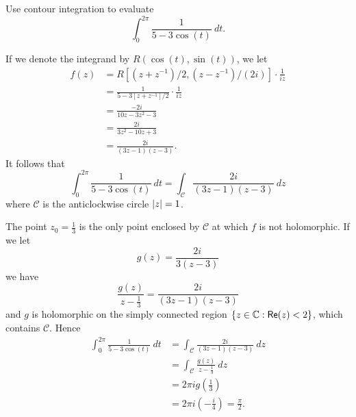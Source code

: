 \begin{example}
Use contour integration to evaluate
\[
\int_0^{2\pi} \frac{1}{5-3\cos (t)}\ dt.
\]

If we denote the integrand by $R(\cos(t),\sin(t))$, we let
\begin{align*}
f(z) &= R \left[ (z+z^{-1})/2 , (z-z^{-1})/(2i) \right] \cdot \frac{1}{iz}\\
& = \frac{1}{5-3[z+z^{-1}]/2} \cdot \frac{1}{iz} \\
& = \frac{-2i}{10z-3z^2-3} \\
& = \frac{2i}{3z^2-10z+3} \\
& = \frac{2i}{(3z-1)(z-3)}.
\end{align*}
It follows that
\[
\int_0^{2\pi} \frac{1}{5-3\cos (t)}\ dt = \int_{\mathcal{C}} \frac{2i}{(3z-1)(z-3)}\ dz
\]
where $\mathcal{C}$ is the anticlockwise circle $\left| z \right|=1$.

The point $z_0=\frac{1}{3}$ is the only point enclosed by $\mathcal{C}$ at which $f$ is not holomorphic.  If we let
\[
g(z) = \frac{2i}{3(z-3)}
\]
we have
\[
\frac{g(z)}{z-\frac{1}{3}} = \frac{2i}{(3z-1)(z-3)}
\]
and $g$ is holomorphic on the simply connected region $\left\{z \in \mathbb{C}: \textsf{Re} (z) < 2\right\}$, which contains $\mathcal{C}$.  Hence
\begin{align*}
\int_0^{2\pi} \frac{1}{5-3 \cos(t)}\ dt &= \int_{\mathcal{C}} \frac{2i}{(3z-1)(z-3)}\ dz \\
& = \int_{\mathcal{C}} \frac{g(z)}{z-\frac{1}{3}}\ dz \\
& = 2\pi i g(\tfrac{1}{3}) \\
& = 2\pi i \left( - \frac{i}{4} \right) = \frac{\pi}{2}.
\end{align*}


\end{example}


